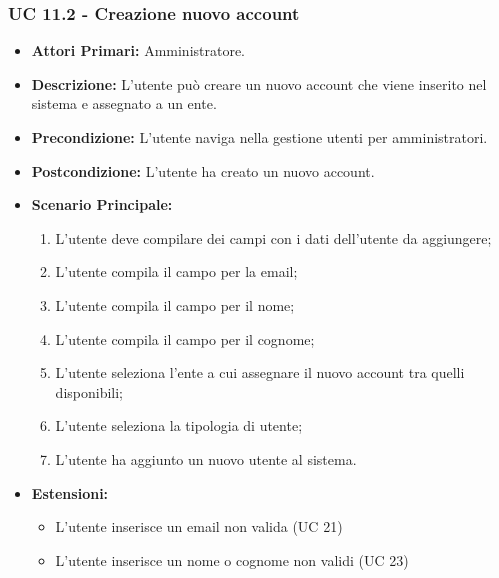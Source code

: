 			\subsubsection{UC 11.2 - Creazione nuovo account}
			\begin{itemize}
				\item \textbf{Attori Primari:} Amministratore.
				\item \textbf{Descrizione:} L'utente può creare un nuovo account che viene inserito nel sistema e assegnato a un ente.
				\item \textbf{Precondizione:} L'utente naviga nella gestione utenti per amministratori.
				\item \textbf{Postcondizione:} L'utente ha creato un nuovo account.
				\item \textbf{Scenario Principale:}
				\begin{enumerate}
					\item{L'utente deve compilare dei campi con i dati dell'utente da aggiungere;}
					\item{L'utente compila il campo per la email;}
					\item{L'utente compila il campo per il nome;}
					\item{L'utente compila il campo per il cognome;}
					\item{L'utente seleziona l'ente a cui assegnare il nuovo account tra quelli disponibili;}
					\item{L'utente seleziona la tipologia di utente;}
					\item{L'utente ha aggiunto un nuovo utente al sistema.}
				\end{enumerate}	
				\item \textbf{Estensioni:}
				\begin{itemize}
					\item L'utente inserisce un email non valida (UC 21)
					\item L'utente inserisce un nome o cognome non validi (UC 23)
				\end{itemize}
			\end{itemize}
			
